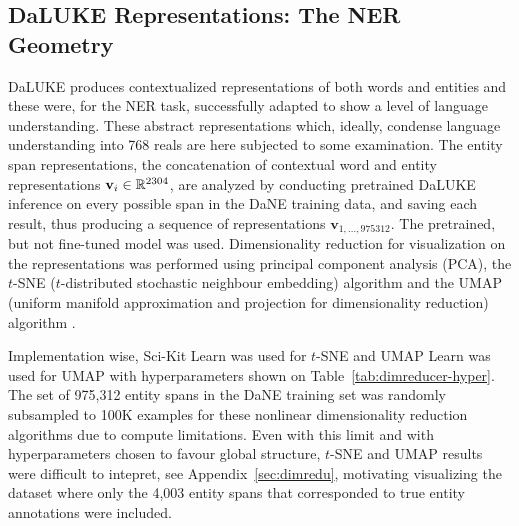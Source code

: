 \documentclass[main.tex]{subfiles}
\begin{document}
\subsection{DaLUKE Representations: The NER Geometry}
DaLUKE produces contextualized representations of both words and entities and these were, for the NER task, successfully adapted to show a level of language understanding.
These abstract representations which, ideally, condense language understanding into 768 reals are here subjected to some examination.
The entity span representations, the concatenation of contextual word and entity representations $\mathbf v_i \in \mathbb R^{2304}$, are analyzed by conducting pretrained DaLUKE inference on every possible span in the DaNE training data, and saving each result, thus producing a sequence of representations $\mathbf v_{1, \ldots, 975312}$.
The pretrained, but not fine-tuned model was used.
Dimensionality reduction for visualization on the representations was performed using principal component analysis (PCA), the $t$-SNE ($t$-distributed stochastic neighbour embedding) algorithm \cite{maaten2008tsne} and the UMAP (uniform manifold approximation and projection for dimensionality reduction) algorithm \cite{mcinnes2020umap}.

Implementation wise, Sci-Kit Learn was used for $t$-SNE \cite{pedregosa2011scikit} and UMAP Learn was used for UMAP \cite{mcinnes2018umap-software} with hyperparameters shown on Table~\ref{tab:dimreducer-hyper}.
The set of 975,312 entity spans in the DaNE training set was randomly subsampled to 100K examples for these nonlinear dimensionality reduction algorithms due to compute limitations.
Even with this limit and with hyperparameters chosen to favour global structure, $t$-SNE and UMAP results were difficult to intepret, see Appendix~\ref{sec:dimredu}, motivating visualizing the dataset where only the 4,003 entity spans that corresponded to true entity annotations were included.
\end{document}
